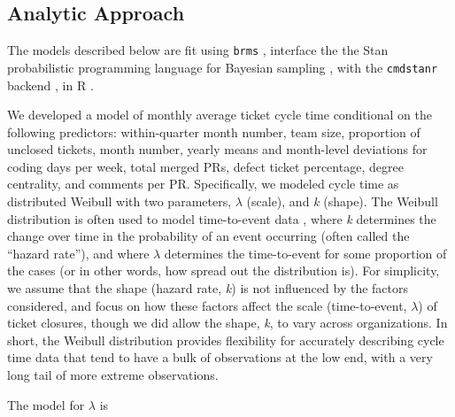 \documentclass[manuscript,screen,review]{acmart}
\begin{document}
\subsection{Analytic Approach}\label{analytic-approach}

The models described below are fit using \texttt{brms}
\citep[v2.21.6,][]{burknerAdvancedBayesianMultilevel2018, burknerBrmsPackageBayesian2017},
interface the the Stan probabilistic programming language for Bayesian
sampling \citep[v2.35.0,][]{gelman}, with the \texttt{cmdstanr} backend
\citep[v0.8.0,][]{gabryCmdstanrInterfaceCmdStan2024}, in R
\citep[v4.3.2,][]{rcoreteamLanguageEnvironmentStatistical2023}.

We developed a model of monthly average ticket cycle time conditional on
the following predictors: within-quarter month number, team size,
proportion of unclosed tickets, month number, yearly means and
month-level deviations for coding days per week, total merged PRs,
defect ticket percentage, degree centrality, and comments per PR.
Specifically, we modeled cycle time as distributed Weibull with two
parameters, \(\lambda\) (scale), and \emph{k} (shape). The Weibull
distribution is often used to model time-to-event data
\citep{harrellRegressionModelingStrategies2015, rummelAverageWeibullAnalysis2017},
where \emph{k} determines the change over time in the probability of an
event occurring (often called the ``hazard rate''), and where
\(\lambda\) determines the time-to-event for some proportion of the
cases (or in other words, how spread out the distribution is). For
simplicity, we assume that the shape (hazard rate, \emph{k}) is not
influenced by the factors considered, and focus on how these factors
affect the scale (time-to-event, \(\lambda\)) of ticket closures, though
we did allow the shape, \emph{k}, to vary across organizations. In
short, the Weibull distribution provides flexibility for accurately
describing cycle time data that tend to have a bulk of observations at
the low end, with a very long tail of more extreme observations.

The model for \(\lambda\) is
\end{document}
